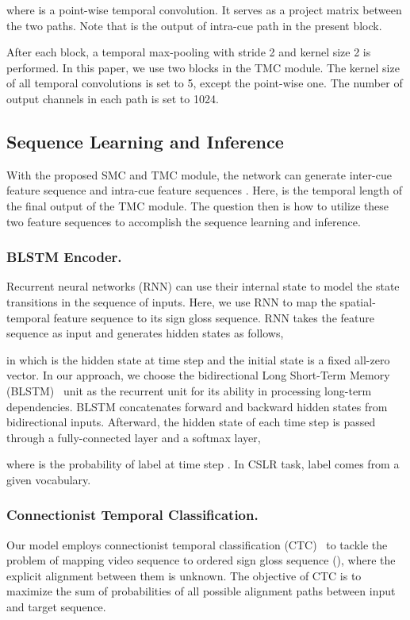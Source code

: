\documentclass[letterpaper]{article} \usepackage{aaai20}  \usepackage{times}  \usepackage{helvet} \usepackage{courier}  \usepackage[hyphens]{url}  \usepackage{graphicx} \urlstyle{rm} \def\UrlFont{\rm}  \usepackage{graphicx}  \frenchspacing  \setlength{\pdfpagewidth}{8.5in}  \setlength{\pdfpageheight}{11in}
\begin{document}
where  is a point-wise temporal convolution. It serves as a project matrix between the two paths. Note that  is the output of intra-cue path in the present block.

After each block, a temporal max-pooling with stride 2 and kernel size 2 is performed. In this paper, we use two blocks in the TMC module. The kernel size  of all temporal convolutions is set to 5, except the point-wise one. The number of output channels  in each path is set to 1024. 


\subsection{Sequence Learning and Inference}
With the proposed SMC and TMC module, the network can generate inter-cue feature sequence  and  intra-cue feature sequences . Here,  is the temporal length of the final output of the TMC module. The question then is how to utilize these two feature sequences to accomplish the sequence learning and inference.
\subsubsection{BLSTM Encoder.}
Recurrent neural networks (RNN) can use their internal state to model the state transitions in the sequence of inputs. Here, we use RNN to map the spatial-temporal feature sequence to its sign gloss sequence. RNN takes the feature sequence as input and generates  hidden states as follows,
  
in which  is the hidden state at time step  and the initial state  is a fixed all-zero vector. 
In our approach, we choose the bidirectional Long Short-Term Memory (BLSTM)~\cite{LSTM} unit as the recurrent unit for its ability in processing long-term dependencies. BLSTM concatenates forward and backward hidden states from bidirectional inputs. Afterward, the hidden state of each time step is passed through a fully-connected layer and a softmax layer,

where  is the probability of label  at time step . In CSLR task, label  comes from a given vocabulary.

\subsubsection{Connectionist Temporal Classification.}
Our model employs connectionist temporal classification (CTC)~\cite{CTC} to tackle the problem of mapping video sequence  to ordered sign gloss sequence  (), where the explicit alignment between them is unknown. 
The objective of CTC is to maximize the sum of probabilities of all possible alignment paths between input and target sequence.
\end{document}
